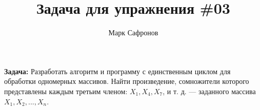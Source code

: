 \documentclass{article}
\title{Задача для упражнения \#03}
\author{Марк Сафронов}
\begin{document}
\maketitle

\textbf{Задача:}
Разработать алгоритм и программу с единственным циклом для обработки одномерных массивов.
Найти произведение, сомножители которого представлены каждым третьим членом:
$X_1, X_4, X_7$, и т. д. --- заданного массива $X_1, X_2, ..., X_n$.
\end{document}
